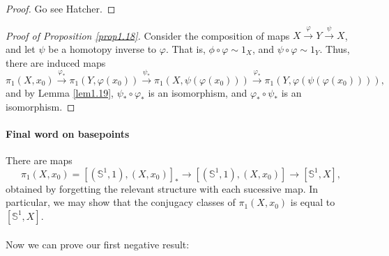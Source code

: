 \documentclass[a4paper]{report}
\theoremstyle{definition}
\theoremstyle{remark}
\theoremstyle{proposition}
\theoremstyle{conjecture}
\theoremstyle{lemma}
\theoremstyle{corollary}
\theoremstyle{exercise}
\begin{document}
\begin{proof}
    Go see Hatcher.
\end{proof}

\begin{proof}[Proof of Proposition \ref{prop1.18}]
    Consider the composition of maps 
    $X \stackrel{\varphi}{\to} Y \stackrel{\psi}{\to} X$,
    and let $\psi$ be a homotopy inverse to $\varphi$.
    That is, $\phi \circ \varphi \sim 1_X$, and 
    $\psi \circ \varphi \sim 1_Y$.
    Thus, there are induced maps
    $$\pi_1(X,x_0) \stackrel{\varphi_\ast}{\longrightarrow} \pi_1(Y,\varphi(x_0)) \stackrel{\psi_\ast}{\longrightarrow} \pi_1(X,\psi(\varphi(x_0))) \stackrel{\varphi_\ast}{\longrightarrow} \pi_1(Y,\varphi(\psi(\varphi(x_0)))),$$
    and by Lemma \ref{lem1.19},
    $\psi_\ast \circ \varphi_\ast$ is an isomorphism, and 
    $\varphi_\ast \circ \psi_\ast$ is an isomorphism.
\end{proof}


\paragraph{Final word on basepoints} There are maps
$$\pi_1(X,x_0) = [(\mathbb{S}^1,1),(X,x_0)]_\ast \longrightarrow [(\mathbb{S}^1,1), (X,x_0)] \longrightarrow [\mathbb{S}^1,X],$$
obtained by forgetting the relevant structure with each sucessive map.
In particular, we may show that the conjugacy classes of $\pi_1(X,x_0)$ 
is equal to $[\mathbb{S}^1,X]$.\\\\
Now we can prove our first negative result:
\end{document}

